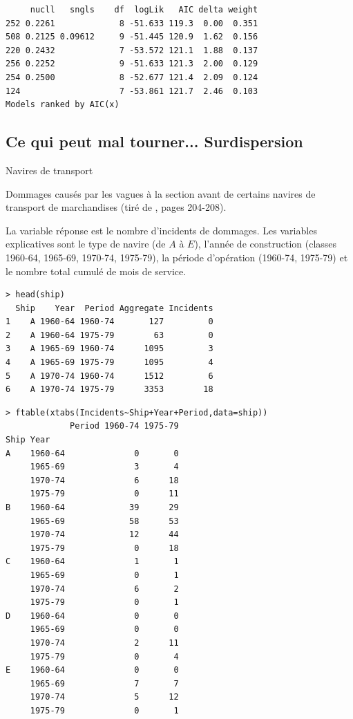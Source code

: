 \documentclass{BeamerTemplate}
\begin{document}
\begin{refsection}
\begin{frame}[fragile]{}
{\begin{verbatim}
     nucll   sngls    df  logLik   AIC delta weight
252 0.2261             8 -51.633 119.3  0.00  0.351
508 0.2125 0.09612     9 -51.445 120.9  1.62  0.156
220 0.2432             7 -53.572 121.1  1.88  0.137
256 0.2252             9 -51.633 121.3  2.00  0.129
254 0.2500             8 -52.677 121.4  2.09  0.124
124                    7 -53.861 121.7  2.46  0.103
Models ranked by AIC(x) 
\end{verbatim}
}

\end{frame}

\subsection{Ce qui peut mal tourner... Surdispersion}

\begin{frame}[fragile]{Navires de transport}

Dommages causés par les vagues à la
section avant de certains navires de transport de marchandises (tiré de ,
pages 204-208).

\bigskip
La variable réponse est le nombre d'incidents de dommages. Les variables explicatives sont le
type de navire (de $A$ à $E$), l'année de construction (classes 1960-64, 1965-69,
1970-74, 1975-79), la période d'opération (1960-74, 1975-79) et le nombre total cumulé
de mois de service.

{\scriptsize
\begin{verbatim}
> head(ship)
  Ship    Year  Period Aggregate Incidents
1    A 1960-64 1960-74       127         0
2    A 1960-64 1975-79        63         0
3    A 1965-69 1960-74      1095         3
4    A 1965-69 1975-79      1095         4
5    A 1970-74 1960-74      1512         6
6    A 1970-74 1975-79      3353        18
\end{verbatim}}
\end{frame}

\begin{frame}[fragile]{}
{\scriptsize
\begin{verbatim}
> ftable(xtabs(Incidents~Ship+Year+Period,data=ship))
             Period 1960-74 1975-79
Ship Year                          
A    1960-64              0       0
     1965-69              3       4
     1970-74              6      18
     1975-79              0      11
B    1960-64             39      29
     1965-69             58      53
     1970-74             12      44
     1975-79              0      18
C    1960-64              1       1
     1965-69              0       1
     1970-74              6       2
     1975-79              0       1
D    1960-64              0       0
     1965-69              0       0
     1970-74              2      11
     1975-79              0       4
E    1960-64              0       0
     1965-69              7       7
     1970-74              5      12
     1975-79              0       1
\end{verbatim}
}
\end{frame}


\end{refsection}
\end{document}
